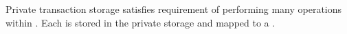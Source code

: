 Private transaction storage satisfies requirement of performing many operations within \transactionj. Each  is stored in the private storage and mapped to a \txItem.



    

